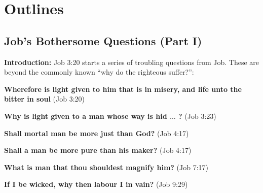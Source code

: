 \section{Outlines}
\subsection{Job's Bothersome Questions (Part I)}
\textbf{Introduction:} Job 3:20 starts a series of troubling questions from Job. These are beyond the commonly known ``why do the righteous suffer?'':%
\begin{compactenum}[I.][19]
    \item  \textbf{Wherefore is light given to him that is
in misery, and life unto the bitter in soul} (Job 3:20)
    \item  \textbf{Why is light given to a man whose way is hid $\hdots$ ?} (Job 3:23)
    \item  \textbf{Shall mortal man be more just than God?} (Job 4:17)
    \item  \textbf{Shall a man be more pure than his maker?} (Job 4:17) 
    \item  \textbf{What is man that thou shouldest magnify him?} (Job 7:17)
    \item  \textbf{If I be wicked, why then labour I in vain?} (Job 9:29)
\end{compactenum}

